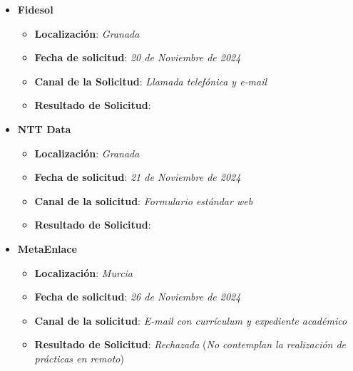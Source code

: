 \begin{itemize}
	\item {\large \textbf{Fidesol}}
	\begin{itemize}
		\item \textbf{Localización}: \textit{Granada}
		\item \textbf{Fecha de solicitud}: \textit{20 de Noviembre de 2024}
		\item \textbf{Canal de la Solicitud}: \textit{Llamada telefónica y e-mail}
		\item \textbf{Resultado de Solicitud}: 
	\end{itemize}
	\item {\large\textbf{NTT Data}}
		\begin{itemize}
		\item \textbf{Localización}: \textit{Granada}
		\item \textbf{Fecha de solicitud}: \textit{21 de Noviembre de 2024}
		\item \textbf{Canal de la solicitud}: \textit{Formulario estándar web}
		\item \textbf{Resultado de Solicitud}: 
	\end{itemize}
		\item {\large\textbf{MetaEnlace}}
	\begin{itemize}
		\item \textbf{Localización}: \textit{Murcia}
		\item \textbf{Fecha de solicitud}: \textit{26 de Noviembre de 2024}
		\item \textbf{Canal de la solicitud}: \textit{E-mail con currículum y expediente académico}
		\item \textbf{Resultado de Solicitud}: \textit{Rechazada} (\textit{No contemplan la realización de prácticas en remoto})
	\end{itemize}
	
\end{itemize}







%

